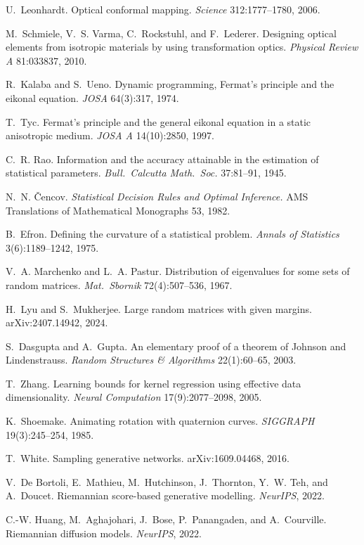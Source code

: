\documentclass[11pt,a4paper]{article}
\theoremstyle{plain}
\theoremstyle{remark}
\begin{document}
\medskip\noindent U.~Leonhardt. Optical conformal mapping. \emph{Science} 312:1777--1780, 2006.

\medskip\noindent M.~Schmiele, V.~S. Varma, C.~Rockstuhl, and F.~Lederer. Designing optical elements from isotropic materials by using transformation optics. \emph{Physical Review A} 81:033837, 2010.

\medskip\noindent R.~Kalaba and S.~Ueno. Dynamic programming, Fermat's principle and the eikonal equation. \emph{JOSA} 64(3):317, 1974.

\medskip\noindent T.~Tyc. Fermat's principle and the general eikonal equation in a static anisotropic medium. \emph{JOSA A} 14(10):2850, 1997.

\medskip\noindent C.~R. Rao. Information and the accuracy attainable in the estimation of statistical parameters. \emph{Bull.\ Calcutta Math.\ Soc.} 37:81--91, 1945.

\medskip\noindent N.~N. \v{C}encov. \emph{Statistical Decision Rules and Optimal Inference.} AMS Translations of Mathematical Monographs 53, 1982.

\medskip\noindent B.~Efron. Defining the curvature of a statistical problem. \emph{Annals of Statistics} 3(6):1189--1242, 1975.

\medskip\noindent V.~A. Marchenko and L.~A. Pastur. Distribution of eigenvalues for some sets of random matrices. \emph{Mat.\ Sbornik} 72(4):507--536, 1967.

\medskip\noindent H.~Lyu and S.~Mukherjee. Large random matrices with given margins. arXiv:2407.14942, 2024.

\medskip\noindent S.~Dasgupta and A.~Gupta. An elementary proof of a theorem of Johnson and Lindenstrauss. \emph{Random Structures \& Algorithms} 22(1):60--65, 2003.

\medskip\noindent T.~Zhang. Learning bounds for kernel regression using effective data dimensionality. \emph{Neural Computation} 17(9):2077--2098, 2005.

\medskip\noindent K.~Shoemake. Animating rotation with quaternion curves. \emph{SIGGRAPH} 19(3):245--254, 1985.

\medskip\noindent T.~White. Sampling generative networks. arXiv:1609.04468, 2016.

\medskip\noindent V.~De Bortoli, E.~Mathieu, M.~Hutchinson, J.~Thornton, Y.~W. Teh, and A.~Doucet. Riemannian score-based generative modelling. \emph{NeurIPS}, 2022.

\medskip\noindent C.-W. Huang, M.~Aghajohari, J.~Bose, P.~Panangaden, and A.~Courville. Riemannian diffusion models. \emph{NeurIPS}, 2022.
\end{document}
